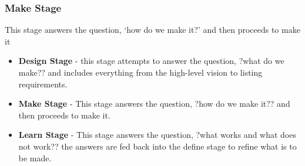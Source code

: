 \begin{frame}
	\frametitle{Make Stage}
	This stage answers the question, `how do we make it?' and then proceeds to make it 
\end{frame}



\begin{frame}
	\begin{itemize}
		\item \textbf{Design Stage} - this stage attempts to answer the question, ?what do we make?? and includes everything from the high-level vision to listing requirements. 
		\item \textbf{Make Stage} - This stage answers the question, ?how do we make it?? and then proceeds to make it. 
		\item \textbf{Learn Stage} - This stage answers the question, ?what works and what does not work?? the answers are fed back into the define stage to refine what is to be made. 
	\end{itemize}
\end{frame}



	

